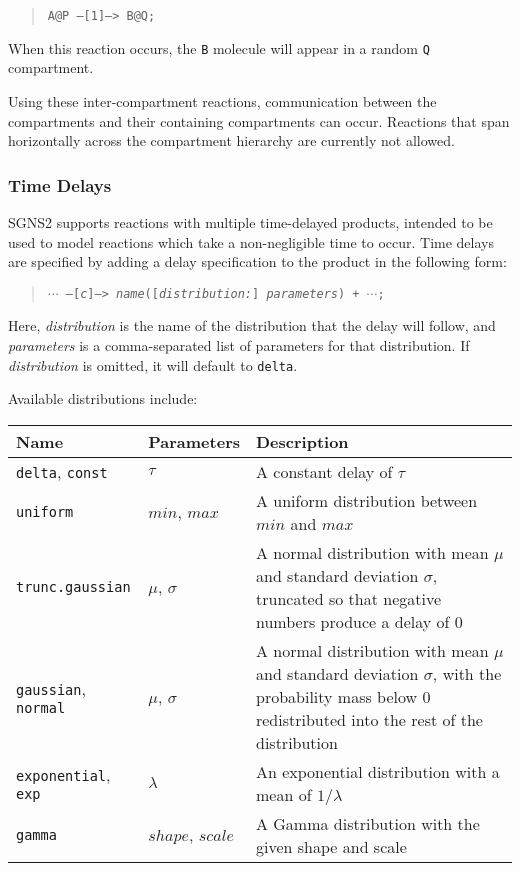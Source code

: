 \documentclass[10pt]{article}
\newcommand{\code}[1]{{\tt {#1}}}
\newcommand{\codeparam}[1]{\textrm{\textit{#1}}}
\newcommand{\optparam}[1]{\textrm{[\textit{#1}]}}
\newcommand{\programname}{SGNS2}
\begin{document}
\begin{quote}
\code{A@P --[1]--> B@Q;}
\end{quote}

When this reaction occurs, the \code{B} molecule will appear in a random \code{Q} compartment.

Using these inter-compartment reactions, communication between the compartments and their containing compartments can occur. Reactions that span horizontally across the compartment hierarchy are currently not allowed.

\subsubsection{Time Delays}
\label{sec:timedelays}

{\programname} supports reactions with multiple time-delayed products, intended to be used to model reactions which take a non-negligible time to occur. Time delays are specified by adding a delay specification to the product in the following form:

\begin{quote}
\code{$\cdots$ --[\codeparam{c}]--> \codeparam{name}(\optparam{distribution\code{:}} \codeparam{parameters}) + $\cdots$;}
\end{quote}

Here, \codeparam{distribution} is the name of the distribution that the delay will follow, and \codeparam{parameters} is a comma-separated list of parameters for that distribution. If \codeparam{distribution} is omitted, it will default to \code{delta}.

Available distributions include:

\begin{center}
\begin{tabular}{p{1in}|l|p{3.4in}}
Name & Parameters & Description\\
\hline \hline \code{delta}, \code{const} & $\tau$ & A constant delay of $\tau$ \\
\hline \code{uniform} & $min$, $max$ & A uniform distribution between $min$ and $max$ \\
\hline \code{trunc.gaussian} & $\mu$, $\sigma$ & A normal distribution with mean $\mu$ and standard deviation $\sigma$, truncated so that negative numbers produce a delay of 0 \\
\hline \code{gaussian}, \code{normal} & $\mu$, $\sigma$ & A normal distribution with mean $\mu$ and standard deviation $\sigma$, with the probability mass below 0 redistributed into the rest of the distribution \\
\hline \code{exponential}, \code{exp} & $\lambda$ & An exponential distribution with a mean of $1/\lambda$ \\
\hline \code{gamma} & $shape$, $scale$ & A Gamma distribution with the given shape and scale
\end{tabular}
\end{center}
\end{document}
